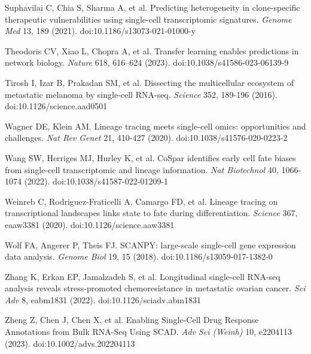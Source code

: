 \documentclass[11pt,a4paper]{article}
\begin{document}
\noindent Suphavilai C, Chia S, Sharma A, et al. Predicting heterogeneity in clone-specific therapeutic vulnerabilities using single-cell transcriptomic signatures. \emph{Genome Med} 13, 189 (2021). doi:10.1186/s13073-021-01000-y \par\vspace{2pt}

\noindent Theodoris CV, Xiao L, Chopra A, et al. Transfer learning enables predictions in network biology. \emph{Nature} 618, 616--624 (2023). doi:10.1038/s41586-023-06139-9\par\vspace{2pt}

\noindent Tirosh I, Izar B, Prakadan SM, et al. Dissecting the multicellular ecosystem of metastatic melanoma by single-cell RNA-seq. \emph{Science} 352, 189-196 (2016). doi:10.1126/science.aad0501 \par\vspace{2pt}

\noindent Wagner DE, Klein AM. Lineage tracing meets single-cell omics: opportunities and challenges. \emph{Nat Rev Genet} 21, 410-427 (2020). doi:10.1038/s41576-020-0223-2 \par\vspace{2pt}

\noindent Wang SW, Herriges MJ, Hurley K, et al. CoSpar identifies early cell fate biases from single-cell transcriptomic and lineage information. \emph{Nat Biotechnol} 40, 1066-1074 (2022). doi:10.1038/s41587-022-01209-1\par\vspace{2pt}

\noindent Weinreb C, Rodriguez-Fraticelli A, Camargo FD, et al. Lineage tracing on transcriptional landscapes links state to fate during differentiation. \emph{Science} 367, eaaw3381 (2020). doi:10.1126/science.aaw3381 \par\vspace{2pt}

\noindent Wolf FA, Angerer P, Theis FJ. SCANPY: large-scale single-cell gene expression data analysis. \emph{Genome Biol} 19, 15 (2018). doi:10.1186/s13059-017-1382-0\par\vspace{2pt}

\noindent Zhang K, Erkan EP, Jamalzadeh S, et al. Longitudinal single-cell RNA-seq analysis reveals stress-promoted chemoresistance in metastatic ovarian cancer. \emph{Sci Adv} 8, eabm1831 (2022). doi:10.1126/sciadv.abm1831 \par\vspace{2pt}

\noindent Zheng Z, Chen J, Chen X, et al. Enabling Single-Cell Drug Response Annotations from Bulk RNA-Seq Using SCAD. \emph{Adv Sci (Weinh)} 10, e2204113 (2023). doi:10.1002/advs.202204113 \par\vspace{2pt}
\end{document}
